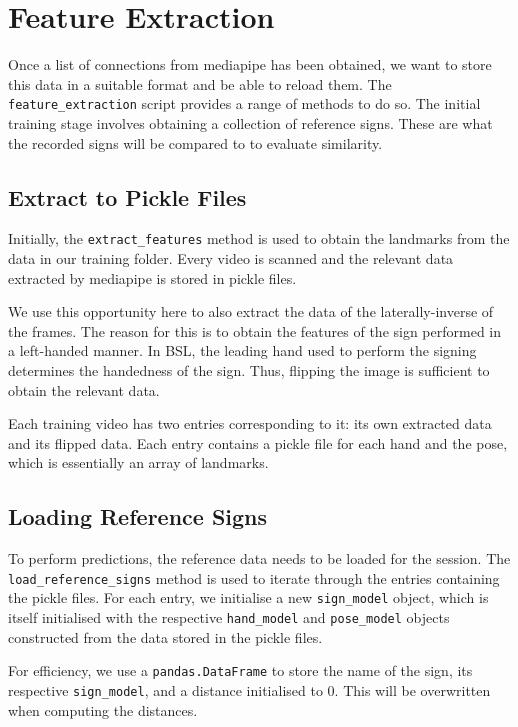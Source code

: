 \documentclass[final,rdr32.tex]{subfiles}
\begin{document}
\section{Feature Extraction}
\label{sec:feature}

Once a list of connections from mediapipe has been obtained, we want to store this data in a suitable format and be able to reload them. The \verb|feature_extraction| script provides a range of methods to do so. The initial training stage involves obtaining a collection of reference signs. These are what the recorded signs will be compared to to evaluate similarity.

\subsection{Extract to Pickle Files}

Initially, the \verb|extract_features| method is used to obtain the landmarks from the data in our training folder. Every video is scanned and the relevant data extracted by mediapipe is stored in pickle files.

We use this opportunity here to also extract the data of the laterally-inverse of the frames. The reason for this is to obtain the features of the sign performed in a left-handed manner. In BSL, the leading hand used to perform the signing determines the handedness of the sign. Thus, flipping the image is sufficient to obtain the relevant data.

Each training video has two entries corresponding to it: its own extracted data and its flipped data. Each entry contains a pickle file for each hand and the pose, which is essentially an array of landmarks.

\subsection{Loading Reference Signs}

To perform predictions, the reference data needs to be loaded for the session. The \verb|load_reference_signs| method is used to iterate through the entries containing the pickle files. For each entry, we initialise a new \verb|sign_model| object, which is itself initialised with the respective \verb|hand_model| and \verb|pose_model| objects constructed from the data stored in the pickle files.

For efficiency, we use a \verb|pandas.DataFrame| to store the name of the sign, its respective \verb|sign_model|, and a distance initialised to 0. This will be overwritten when computing the distances.
\end{document}
